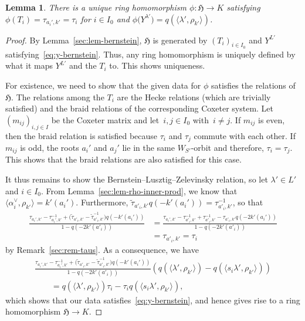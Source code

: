 \documentclass[10pt,a4paper]{amsart}
\newtheorem{Lemma}[Theorem]{Lemma}
\theoremstyle{definition}
\numberwithin{equation}{section}
\begin{document}
\begin{Lemma}\label{sec:lem-trivial-character}
 There is a unique ring homomorphism $\phi\colon \mathfrak{H}\to K$ satisfying
 $\phi(T_i) = \tau_{a_i',k'}=\tau_i$ for $i\in I_0$ and
$
 \phi\bigl(Y^{\lambda'}\bigr) = q(\langle \lambda', \rho_{k'}\rangle)$.
\end{Lemma}
\begin{proof}
 By Lemma~\ref{sec:lem-bernstein}, $\mathfrak{H}$ is generated by $(T_i)_{i\in I_0}$ and $Y^{L'}$ satisfying~\eqref{eq:y-bernstein}.
 Thus, any ring homomorphism is uniquely defined by what it maps $Y^{L'}$ and the $T_i$ to. This shows uniqueness.

 For existence, we need to show that the given data for $\phi$
 satisfies the relations of $\mathfrak{H}$. The relations
 among the $T_i$ are the Hecke relations (which are trivially satisfied) and the braid relations of the corresponding Coxeter
 system. Let $(m_{ij})_{i,j\in I}$ be the Coxeter matrix and let~${i,j\in I_0}$ with~${i\ne j}$. If $m_{ij}$ is even, then the
 braid relation is satisfied because $\tau_i$ and $\tau_j$ commute with each other. If $m_{ij}$ is odd, the
 roots $a_i'$ and $a_j'$ lie in the same $W_{S'}$-orbit and therefore,
 $\tau_i=\tau_j$. This shows that the braid relations
 are also satisfied for this case.

 It thus remains to show the Bernstein--Lusztig--Zelevinsky relation, so let $\lambda'\in L'$
 and $i\in I_0$. From Lemma~\ref{sec:lem-rho-inner-prod}, we know
 that $\langle\alpha_i^\vee,\rho_{k'}\rangle=k'(a_i')$. Furthermore,
 $\tilde{\tau}_{a'_i,k'}q(-k'(a_i'))=\tau_{a'_i,k'}^{-1}$, so that
 \begin{align*}
 \frac{\tau_{a_i',k'} - \tau_{a_i',k'}^{-1} + \bigl(\tilde{\tau}_{a'_i,k'} - \tilde{\tau}_{a'_i,k'}^{-1}\bigr)q(-k'(a_i'))}{1-q(-2k'(a'_i))}
& = \frac{\tau_{a_i',k'} - \tau_{a'_i,k'}^{-1}
 + \tau_{a'_i,k'}^{-1} - \tau_{a'_i,k'}q(-2k'(a_i'))}{1-q(-2k'(a'_i))}\\
& = \tau_{a'_i, k'} = \tau_i
 \end{align*}
 by Remark~\ref{sec:rem-taus}.
 As a consequence, we have
 \begin{gather*}
 \frac{\tau_{a_i',k'} - \tau_{a_i',k'}^{-1} + \bigl(\tilde{\tau}_{a'_i,k'} - \tilde{\tau}_{a'_i,k'}^{-1}\bigr)q(-k'(a_i'))}{1-q(-2k'(a'_i))} (q(\langle\lambda',\rho_{k'}\rangle)-q(\langle s_i\lambda',\rho_{k'}\rangle))\\
\qquad = q(\langle\lambda',\rho_{k'}\rangle)\tau_i
 - \tau_iq(\langle s_i\lambda',\rho_{k'}\rangle),
 \end{gather*}
 which shows that our data satisfies~\eqref{eq:y-bernstein}, and hence gives rise to a ring homomorphism \linebreak $\mathfrak{H}\to K$.
\end{proof}
\end{document}
